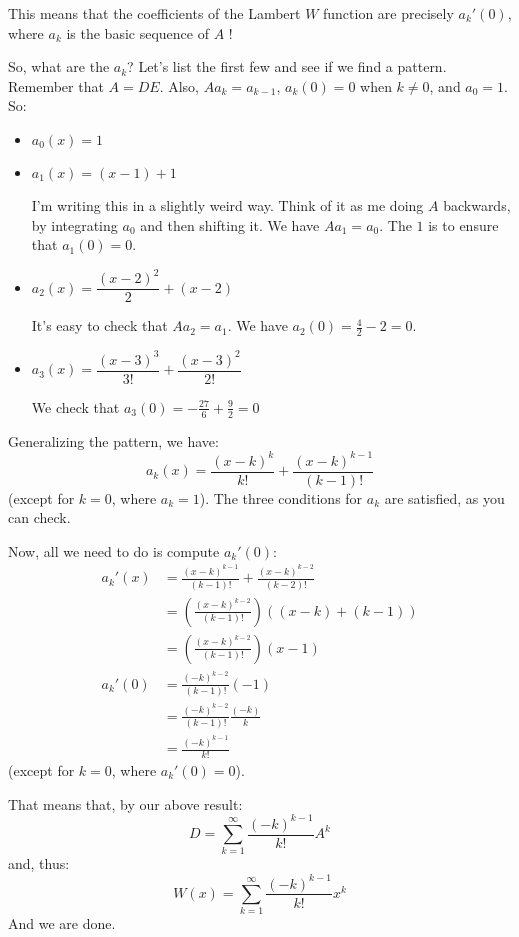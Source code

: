\documentclass[11pt, oneside]{article}   	%
\begin{document}
This means that the coefficients of the Lambert $W$ function are precisely $a_k'(0)$, where $a_k$ is the basic sequence of $A$ !

So, what are the $a_k$? Let's list the first few and see if we find a pattern. Remember that $A=DE$. Also, $Aa_k=a_{k-1}$, $a_k(0)=0$ when $k\ne0$, and $a_0=1$. So:
\begin{itemize}
\item $a_0(x)=1$
\item $a_1(x)=(x-1)+1$

I'm writing this in a slightly weird way. Think of it as me doing $A$ backwards, by integrating $a_0$ and then shifting it. We have $Aa_1=a_0$. The $1$ is to ensure that $a_1(0)=0$.
\item $a_2(x)=\dfrac{(x-2)^2}2+(x-2)$

It's easy to check that $Aa_2=a_1$. We have $a_2(0)=\frac42-2=0$.
\item $a_3(x)=\dfrac{(x-3)^3}{3!}+\dfrac{(x-3)^2}{2!}$

We check that $a_3(0)=-\frac{27}6+\frac 92=0$
\end{itemize}
Generalizing the pattern, we have:
$$a_k(x)=\dfrac{(x-k)^k}{k!}+\dfrac{(x-k)^{k-1}}{(k-1)!}$$
(except for $k=0$, where $a_k=1$). The three conditions for $a_k$ are satisfied, as you can check.

Now, all we need to do is compute $a_k'(0)$:
\begin{align*}
a_k'(x)&=\frac{(x-k)^{k-1}}{(k-1)!}+\frac{(x-k)^{k-2}}{(k-2)!}\\
&=\left(\frac{(x-k)^{k-2}}{(k-1)!}\right)((x-k)+(k-1))\\
&=\left(\frac{(x-k)^{k-2}}{(k-1)!}\right)(x-1)\\
a_k'(0)&=\frac{(-k)^{k-2}}{(k-1)!}(-1)\\
&=\frac{(-k)^{k-2}}{(k-1)!}\frac{(-k)}{k}\\
&=\frac{(-k)^{k-1}}{k!}
\end{align*}
(except for $k=0$, where $a_k'(0)=0$).

That means that, by our above result:
$$D=\sum_{k=1}^\infty\frac{(-k)^{k-1}}{k!}A^k$$
and, thus:
$$W(x)=\sum_{k=1}^\infty\frac{(-k)^{k-1}}{k!}x^k$$
And we are done.
\end{document}
